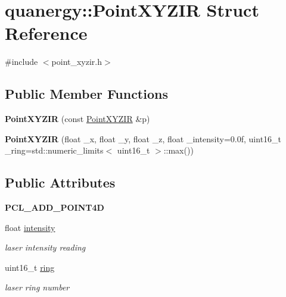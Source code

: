 \hypertarget{structquanergy_1_1PointXYZIR}{\section{quanergy\-:\-:Point\-X\-Y\-Z\-I\-R Struct Reference}
\label{structquanergy_1_1PointXYZIR}
}


{\ttfamily \#include $<$point\-\_\-xyzir.\-h$>$}

\subsection*{Public Member Functions}
\begin{DoxyCompactItemize}
\item 
\hypertarget{structquanergy_1_1PointXYZIR_a68e97c0e5cb30c3cbc37e2d5ff812f92}{{\bfseries Point\-X\-Y\-Z\-I\-R} (const \hyperlink{structquanergy_1_1PointXYZIR}{Point\-X\-Y\-Z\-I\-R} \&p)}\label{structquanergy_1_1PointXYZIR_a68e97c0e5cb30c3cbc37e2d5ff812f92}

\item 
\hypertarget{structquanergy_1_1PointXYZIR_afacccd6a267cac839fb9bbc38b069cd2}{{\bfseries Point\-X\-Y\-Z\-I\-R} (float \-\_\-x, float \-\_\-y, float \-\_\-z, float \-\_\-intensity=0.\-0f, uint16\-\_\-t \-\_\-ring=std\-::numeric\-\_\-limits$<$ uint16\-\_\-t $>$\-::max())}\label{structquanergy_1_1PointXYZIR_afacccd6a267cac839fb9bbc38b069cd2}

\end{DoxyCompactItemize}
\subsection*{Public Attributes}
\begin{DoxyCompactItemize}
\item 
\hypertarget{structquanergy_1_1PointXYZIR_a26be2abe12ae5adf9220940671e62c2b}{{\bfseries P\-C\-L\-\_\-\-A\-D\-D\-\_\-\-P\-O\-I\-N\-T4\-D}}\label{structquanergy_1_1PointXYZIR_a26be2abe12ae5adf9220940671e62c2b}

\item 
\hypertarget{structquanergy_1_1PointXYZIR_a964fda4118869ed37f19257431152a82}{float \hyperlink{structquanergy_1_1PointXYZIR_a964fda4118869ed37f19257431152a82}{intensity}}\label{structquanergy_1_1PointXYZIR_a964fda4118869ed37f19257431152a82}

\begin{DoxyCompactList}\small\item\em laser intensity reading \end{DoxyCompactList}\item 
\hypertarget{structquanergy_1_1PointXYZIR_a62b42a446804ce2dd9d4c8167f8b4c9e}{uint16\-\_\-t \hyperlink{structquanergy_1_1PointXYZIR_a62b42a446804ce2dd9d4c8167f8b4c9e}{ring}}\label{structquanergy_1_1PointXYZIR_a62b42a446804ce2dd9d4c8167f8b4c9e}

\begin{DoxyCompactList}\small\item\em laser ring number \end{DoxyCompactList}\end{DoxyCompactItemize}


